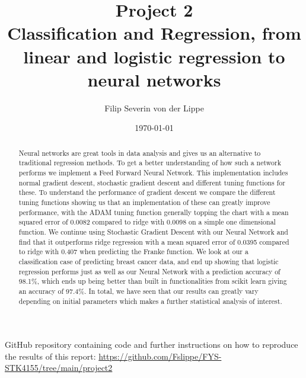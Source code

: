 \documentclass[11pt]{article}
\title{Project 2\\ Classification and Regression, from linear and logistic regression to neural networks}
\author{Filip Severin von der Lippe}
\date{\today}
\begin{document}
\maketitle
GitHub repository containing code and further instructions on how to reproduce the results of this report: \url{https://github.com/Fslippe/FYS-STK4155/tree/main/project2}
\begin{abstract}
    Neural networks are great tools in data analysis and gives us an alternative to traditional regression methods. To get a better understanding of how such a network performs we implement a Feed Forward Neural Network. This implementation includes normal gradient descent, stochastic gradient descent and different tuning functions for these. To understand the performance of gradient descent we compare the different tuning functions showing us that an implementation of these can greatly improve performance, with the ADAM tuning function generally topping the chart with a mean squared error of 0.0082 compared to ridge with 0.0098 on a simple one dimensional function. We continue using Stochastic Gradient Descent with our Neural Network and find that it outperforms ridge regression with a mean squared error of 0.0395 compared to ridge with 0.407 when predicting the Franke function. We look at our a classification case of predicting breast cancer data, and end up showing that logistic regression performs just as well as our Neural Network with a prediction accuracy of 98.1\%, which ends up being better than built in functionalities from scikit learn giving an accuracy of 97.4\%. In total, we have seen that our results can greatly vary depending on initial parameters which makes a further statistical analysis of interest.
\end{abstract}
\newpage
\tableofcontents
\newpage
\end{document}
